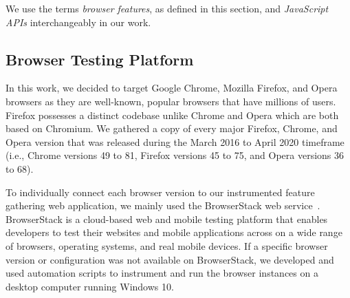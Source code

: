 We use the terms \textit{browser features}, as defined in this section,
and \textit{JavaScript APIs} interchangeably in our work.




\subsection{Browser Testing Platform}

In this work, we decided to target Google Chrome, Mozilla
Firefox, and Opera browsers as they are well-known, popular browsers that have
millions of users. Firefox possesses a distinct codebase unlike Chrome and Opera
which are both based on Chromium. We gathered a copy of every major Firefox, Chrome, and Opera version that was
released during the March 2016 to April 2020 timeframe (i.e., Chrome
versions 49 to 81, Firefox versions 45 to 75, and Opera versions 36 to 68).

To individually connect each browser version to our instrumented
feature gathering web application, we mainly used the BrowserStack web
service~\cite{browserstack}. BrowserStack is a cloud-based web and mobile testing platform
that enables developers to test their websites and mobile applications
across on a wide range of browsers, operating systems, and real mobile
devices. If a specific browser version or configuration was not
available on BrowserStack, we developed and used automation scripts to
instrument and run the browser instances on a desktop computer running
Windows 10.



